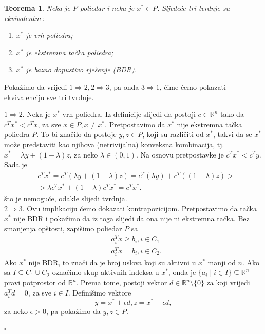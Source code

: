 \documentclass[a4paper, utf8, 11pt, colorlinks]{book}
\newtheorem{thm}{Teorema}
\newenvironment{proof}{{Dokaz:}}{\hfill$\square$}
\begin{document}
\begin{thm}
   Neka je $P$ poliedar i neka je $x^* \in P$. Sljedeće tri tvrdnje su ekvivalentne:
   \begin{enumerate}
       \item $x^*$ je vrh poliedra;
       \item $x^*$ je ekstremna tačka poliedra;
       \item $x^*$ je bazno dopustivo rješenje (BDR).
   \end{enumerate}
\end{thm}

\begin{proof}
      Pokažimo da vrijedi $1 \Rightarrow 2, 2 \Rightarrow 3$, pa onda $3 \Rightarrow 1$, čime ćemo pokazati ekvivalenciju sve tri tvrdnje.
      
      $1 \Rightarrow 2$. Neka je $x^*$ vrh poliedra. Iz definicije slijedi da 
      postoji $c\in \mathbb{R}^n$ tako da $c^Tx^* < c^T x$, za sve $x \in P, x \neq x^*$. Pretpostavimo da $x^*$ nije ekstremna tačka poliedra $P$. 
      To bi značilo da postoje $y,z \in P$, koji su različiti od $x^*$, takvi da se $x^*$ može predstaviti kao njihova (netrivijalna) konveksna kombinacija, tj. $x^* = \lambda y + (1 - \lambda) z $, za neko $\lambda \in (0,1 )$. Na osnovu pretpostavke je $c^T x^* < c^T y$. Sada je 
      \begin{align}
          &c^T x^* = c^T ( \lambda y + (1 - \lambda) z )  = c^T( \lambda y) + c^T((1- \lambda) z) > \nonumber \\
          &>\lambda c^T x^* + ( 1 - \lambda) c^T x^* = c^T x^*.
      \end{align}
      što je nemoguće, odakle slijedi tvrdnja. \\
      $2 \Rightarrow 3$.
       Ovu implikaciju ćemo dokazati kontrapozicijom. Pretpostavimo da tačka $x^*$ nije BDR i pokažimo da iz toga slijedi da ona nije ni ekstremna tačka.
      Bez smanjenja opštosti, zapišimo poliedar $P$ sa 
       \begin{align}
            & a_i^T x \geq b_i, i \in C_1 \\
            & a_i^T x  = b_i, i \in C_2.
       \end{align}
       Ako $x^*$ nije BDR, to znači da je broj uslova koji su aktivni u $x^*$ manji od $n$. 
       Ako sa $I \subseteq C_1 \cup C_2$ označimo skup aktivnih indeksa u $x^*$, onda 
       je $\{ a_i \mid i \in I \} \subseteq \mathbb{R}^n$ pravi potprostor od $\mathbb{R}^n$.  Prema tome, postoji vektor $d \in \mathbb{R}^n \setminus \{0\}$ za koji vrijedi $a_i^T d = 0$, za sve $i \in I$. Definišimo vektore 
       $$ y = x^* + \epsilon d, z = x^* - \epsilon d, $$
       za neko $\epsilon > 0$, pa pokažimo da $y, z \in P$.
       

\end{proof}
\end{document}
